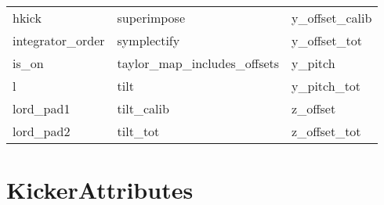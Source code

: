 \begin{tabular}{lll}
hkick                       & superimpose                 & y_offset_calib              \\
integrator_order            & symplectify                 & y_offset_tot                \\
is_on                       & taylor_map_includes_offsets & y_pitch                     \\
l                           & tilt                        & y_pitch_tot                 \\
lord_pad1                   & tilt_calib                  & z_offset                    \\
lord_pad2                   & tilt_tot                    & z_offset_tot                \\
 \bottomrule
 \end{tabular}
 \vfill
 
 \section{KickerAttributes}
 \label{s:list.kicker}
 
